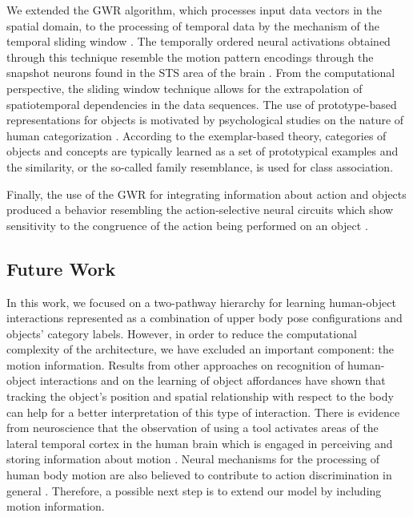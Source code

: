 \documentclass[5p,times]{elsarticle}
\begin{document}
We extended the GWR algorithm, which processes input data vectors in the spatial domain, to the processing of temporal data by the mechanism of the temporal sliding window \citep{parisi2014human}.
The temporally ordered neural activations obtained through this technique resemble the motion pattern encodings through the snapshot neurons found in the STS area of the brain \citep{giese2003neural}. 
From the computational perspective, the sliding window technique allows for the extrapolation of spatiotemporal dependencies in the data sequences. 
The use of prototype-based representations for objects is motivated by psychological studies on the nature of human categorization \citep{rosch1975family}. 
According to the exemplar-based theory, categories of objects and concepts are typically learned as a set of prototypical examples and the similarity, or the so-called family resemblance, is used for class association. 

Finally, the use of the GWR for integrating information about action and objects produced a behavior resembling the action-selective neural circuits which show sensitivity to the congruence of the action being performed on an object \citep{yoon2012neural}.  

\subsection{Future Work}

In this work, we focused on a two-pathway hierarchy for learning human-object interactions represented as a combination of upper body pose configurations and objects' category labels. 
However, in order to reduce the computational complexity of the architecture, we have excluded an important component: the motion information.
Results from other approaches on recognition of human-object interactions and on the learning of object affordances \cite{kjellstrom2011visual, koppula2013learning} have shown that tracking the object's position and spatial relationship with respect to the body can help for a better interpretation of this type of interaction. 
There is evidence from neuroscience that the observation of using a tool activates areas of the lateral temporal cortex in the human brain which is engaged in perceiving and storing information about motion \citep{beauchamp2002parallel}. 
Neural mechanisms for the processing of human body motion are also believed to contribute to action discrimination in general \citep{giese2003neural}. 
Therefore, a possible next step is to extend our model by including motion information.
 
\end{document}
